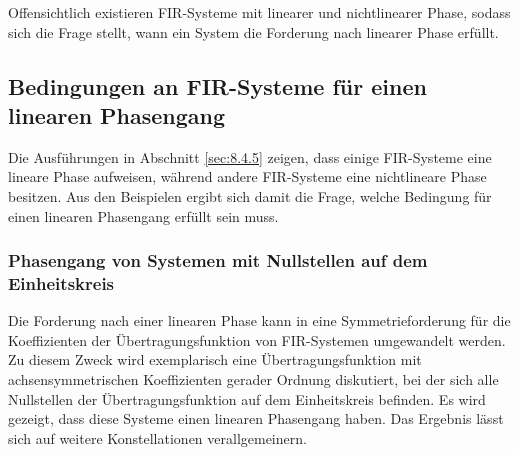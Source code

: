 Offensichtlich existieren FIR-Systeme mit linearer und nichtlinearer Phase, sodass sich die Frage stellt, wann ein System die Forderung nach linearer Phase erfüllt.

\subsection{Bedingungen an FIR-Systeme für einen linearen Phasengang}\label{sec:8.4.6}

Die Ausführungen in Abschnitt \ref{sec:8.4.5} zeigen, dass einige FIR-Systeme eine lineare Phase aufweisen, während andere FIR-Systeme eine nichtlineare Phase besitzen. Aus den Beispielen ergibt sich damit die Frage, welche Bedingung für einen linearen Phasengang erfüllt sein muss.

\subsubsection{Phasengang von Systemen mit Nullstellen auf dem Einheitskreis}\label{sec:phasengang-von-systemen-mit-nullstellen-auf-dem-einheitskreis}

Die Forderung nach einer linearen Phase kann in eine Symmetrieforderung für die Koeffizienten der Übertragungsfunktion von FIR-Systemen umgewandelt werden. Zu diesem Zweck wird exemplarisch eine Übertragungsfunktion mit achsensymmetrischen Koeffizienten gerader Ordnung diskutiert, bei der sich alle Nullstellen der Übertragungsfunktion auf dem Einheitskreis befinden. Es wird gezeigt, dass diese Systeme einen linearen Phasengang haben. Das Ergebnis lässt sich auf weitere Konstellationen verallgemeinern.

